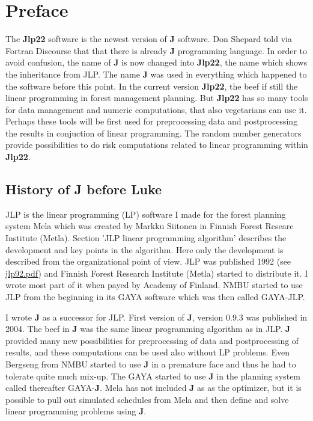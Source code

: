 \section{Preface} 
\label{preface0} 
The \textbf{Jlp22} software is the newest version of \textbf{J} software. Don Shepard told via Fortran Discourse that 
that there is already \textbf{J} programming language. In order to avoid confusion, 
the name of \textbf{J} is now changed 
into \textbf{Jlp22}, the name which shows the inheritance from JLP. The name \textbf{J} was used in everything which  happened 
to the software before this point. 
In the current version \textbf{Jlp22}, the beef if still the linear programming in forest management planning. 
But \textbf{Jlp22} has so many tools for 
data management and numeric computations,	that also vegetarians can use it. 
Perhaps these tools will be first used for preprocessing  data and postprocessing 
the results in conjuction of linear programming. The random number generators 
provide possibilities to do risk computations related to linear programming within \textbf{Jlp22}. 
 
\subsection*{History of \textbf{J} before Luke} 
 
JLP is the linear programming (LP) software I made for the forest planning system Mela 
which was created by Markku Siitonen in Finnish Forest Researc Institute 
(Metla). Section 'JLP linear programming algorithm' describes the development and key points in the algorithm. 
Here only the development is described from the organizational point of view. 
JLP was published 1992 (see \href{run:./jlp92.pdf}{jlp92.pdf}) and 
Finnish Forest Research Institute (Metla) started to distribute it. 
I wrote most part of it when payed by Academy of Finland. 
NMBU started to use JLP from the beginning in its GAYA software which was then called GAYA-JLP. 
 
 
 
I wrote \textbf{J} as a successor for JLP. First version of \textbf{J}, 
version 0.9.3 was published in 2004. The beef in \textbf{J} was the same linear programming 
algorithm as in JLP. \textbf{J} provided many new possibilities 
for preprocessing of data and postprocessing of results, and these computations 
can be used  also without LP problems. 
Even Bergseng from NMBU 
started to use \textbf{J} in a premature face and thus he had to tolerate quite much mix-up. The GAYA 
started to use \textbf{J} in the planning system called thereafter GAYA-\textbf{J}. Mela has not 
included \textbf{J} as 
as the optimizer, but it is possible to pull out simulated schedules from Mela and then 
define and solve linear programming problems using \textbf{J}. 
 
